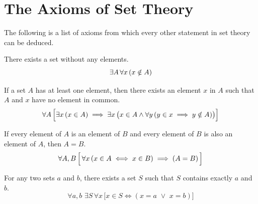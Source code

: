 \chapter{The Axioms of Set Theory}  \label{ch:zfc-axioms}

The following is a list of axioms from which every other statement in set theory can be deduced.

\begin{axm}
    \label{axm:axiom-of-existence}
    There exists a set without any elements.
    \begin{equation*}
        \exists A \, \forall x \, \mleft( x \notin A \mright)
    \end{equation*}
\end{axm}

\begin{axm}
    \label{axm:axiom-of-regularity}
    If a set \( A \) has at least one element, then there exists an element \( x \) in \( A \) such that
    \( A \) and \( x \) have no element in common.
    \begin{equation*}
        \forall A \, \Big[ \exists x \, \mleft( x \in A \mright)
        \implies
        \exists x \, \big( x \in A \land \forall y \, \mleft( y \in x \implies y \notin A \mright) \big)
        \Big]
    \end{equation*}
\end{axm}

\begin{axm}
    \label{axm:axiom-of-extensionality}
    If every element of \( A \) is an element of \( B \) and every element of \( B \) is also an element of \( A \), then \( A = B \).
    \begin{equation*}
        \forall A,B \, \Big[\, \forall x \left( x \in A \iff x \in B \right) \implies \mleft( A = B \mright) \,\Big]
    \end{equation*}
\end{axm}

\begin{axm}
    \label{axm:axiom-of-pairing}
    For any two sets \( a \) and \( b \), there exists a set \( S \) such that \( S \) contains exactly \( a \) and \( b \).
    \begin{equation*}
        \forall a,b \, \, \exists S \, \forall x \, \Big[ x \in S \iff (x = a \,\,{\lor}\,\, x = b) \Big]
    \end{equation*}
\end{axm}


